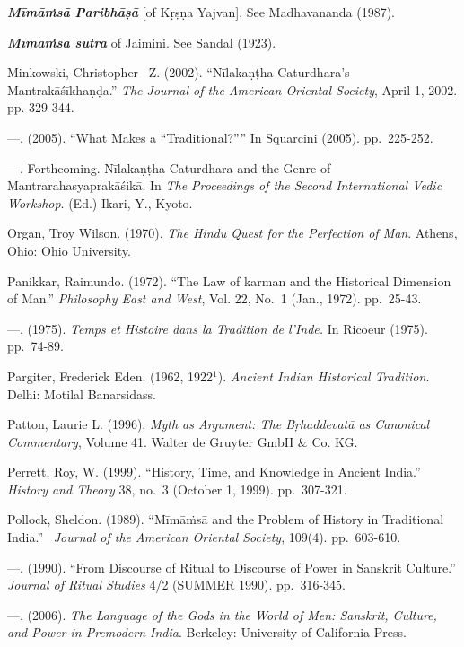 \begin{thebibliography}{99}
  \textbf{\textit{Mīmāṁsā Paribhāṣā}} [of Kṛṣṇa Yajvan]. See Madhavananda (1987).

  \textbf{\textit{Mīmāṁsā sūtra}} of Jaimini. See Sandal (1923).

  Minkowski, Christopher  Z. (2002). “Nīlakaṇṭha Caturdhara's Mantrakāśīkhaṇḍa.” \textit{The Journal of the American Oriental Society}, April 1, 2002. pp. 329-344.

  —. (2005). “What Makes a “Traditional?”” In Squarcini (2005). pp.~225-252.

  —. Forthcoming. Nīlakaṇṭha Caturdhara and the Genre of Mantrarahasyaprakāśikā. In \textit{The Proceedings of the Second International Vedic Workshop}. (Ed.) Ikari, Y., Kyoto.

  Organ, Troy Wilson. (1970). \textit{The Hindu Quest for the Perfection of Man}. Athens, Ohio: Ohio University.

  Panikkar, Raimundo. (1972). “The Law of karman and the Historical Dimension of Man.” \textit{Philosophy East and West}, Vol. 22, No.~1 (Jan., 1972). pp.~25-43.

  —. (1975). \textit{Temps et Histoire dans la Tradition de l’Inde.} In Ricoeur (1975). pp.~74-89.

  Pargiter, Frederick Eden. (1962, 1922$^{1}$). \textit{Ancient Indian Historical Tradition}. Delhi: Motilal Banarsidass.

  Patton, Laurie L. (1996). \textit{Myth as Argument: The Bṛhaddevatā as Canonical Commentary}, Volume 41. Walter de Gruyter GmbH \& Co. KG.

  Perrett, Roy, W. (1999). “History, Time, and Knowledge in Ancient India.” \textit{History and Theory} 38, no.~3 (October 1, 1999). pp.~307-321.

  Pollock, Sheldon. (1989). “Mīmāṁsā and the Problem of History in Traditional India.”  \textit{Journal of the American Oriental Society}, 109(4). pp.~603-610.

  —. (1990). “From Discourse of Ritual to Discourse of Power in Sanskrit Culture.” \textit{Journal of Ritual Studies} 4/2 (SUMMER 1990). pp.~316-345.

  —. (2006). \textit{The Language of the Gods in the World of Men: Sanskrit, Culture, and Power in Premodern India}. Berkeley: University of California Press.


\end{thebibliography}

